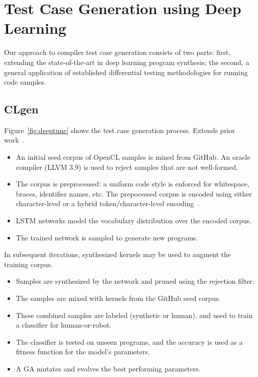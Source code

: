 \section{Test Case Generation using Deep Learning}

Our approach to compiler test case generation consists of two parts: first, extending the state-of-the-art in deep learning program synthesis; the second, a general application of established differential testing methodologies for running code samples.


\subsection{CLgen}

Figure~\ref{fig:deeptune} shows the test case generation process. Extends prior work~\cite{Cummins2017a}.

\begin{itemize}
\item An initial seed corpus of OpenCL samples is mined from GitHub. An oracle compiler (LLVM 3.9) is used to reject samples that are not well-formed.
\item The corpus is preprocessed: a uniform code style is enforced for whitespace, braces, identifier names, etc. The prepocessed corpus is encoded using either character-level or a hybrid token/character-level encoding~\cite{Cummins2017b}.
\item LSTM networks model the vocabulary distribution over the encoded corpus.
\item The trained network is sampled to generate new programs.
\end{itemize}

\noindent In subsequent iterations, synthesized kernels may be used to augment the training corpus.

\begin{itemize}
\item Samples are synthesized by the network and pruned using the rejection filter.
\item The samples are mixed with kernels from the GitHub seed corpus.
\item These combined samples are labeled (synthetic or human), and used to train a classifier for human-or-robot.
\item The classifier is tested on unseen programs, and the accuracy is used as a fitness function for the model's parameters.
\item A GA mutates and evolves the best performing parameters.
\end{itemize}


